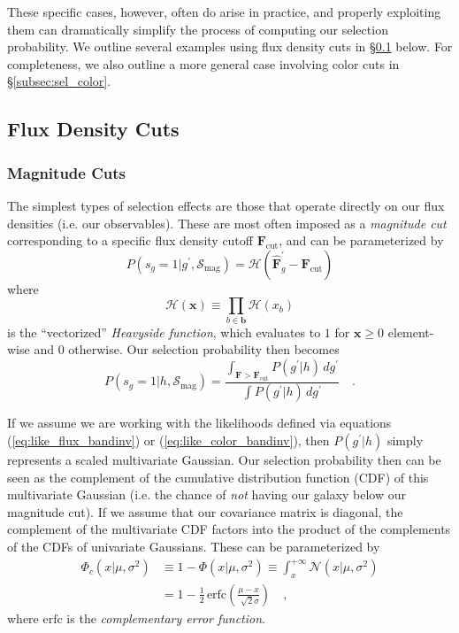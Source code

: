 \documentclass[a4paper,fleqn,usenatbib,english]{mnras}
\newcommand{\rom}[2]{\ensuremath{#1_{\mathrm{#2}}}} %
\newcommand{\erfc}{\ensuremath{\textrm{erfc}}} %
\begin{document}
These specific cases, however, often do arise in practice, and properly exploiting them can dramatically simplify the process of computing our selection probability. We outline several examples using flux density cuts in \S\ref{subsec:sel_flux} below. For completeness, we also outline a more general case involving color cuts in \S\ref{subsec:sel_color}.

\subsection{Flux Density Cuts}
\label{subsec:sel_flux}

\subsubsection{Magnitude Cuts}
\label{subsubsec:sel_mag}

The simplest types of selection effects are those that operate directly on our flux densities (i.e. our observables). These are most often imposed as a \textit{magnitude cut} corresponding to a specific flux density cutoff $\rom{\mathbf{F}}{cut}$, and can be parameterized by
\begin{equation}
P(s_g=1|g^\prime,\rom{\mathcal{S}}{mag})=\mathcal{H}(\mathbf{\hat{F}}^\prime_g-\rom{\mathbf{F}}{cut})
\end{equation}
where
\begin{equation}
\mathcal{H}(\mathbf{x}) \equiv \prod_{b\in\mathbf{b}} \mathcal{H}(x_b)
\end{equation}
is the ``vectorized'' \textit{Heavyside function}, which evaluates to $1$ for $\mathbf{x} \geq 0$ element-wise and $0$ otherwise. Our selection probability then becomes
\begin{equation}
P(s_g=1|h,\rom{\mathcal{S}}{mag}) = \frac{\int_{\mathbf{F}>\rom{\mathbf{F}}{cut}} P(g^\prime|h) \, dg^\prime}{\int P(g^\prime|h) \, dg^\prime} \quad .
\end{equation}

If we assume we are working with the likelihoods defined via equations (\ref{eq:like_flux_bandinv}) or (\ref{eq:like_color_bandinv}), then $P(g^\prime|h)$ simply represents a scaled multivariate Gaussian. Our selection probability then can be seen as the complement of the cumulative distribution function (CDF) of this multivariate Gaussian (i.e. the chance of \textit{not} having our galaxy below our magnitude cut). If we assume that our covariance matrix is diagonal, the complement of the multivariate CDF factors into the product of the complements of the CDFs of univariate Gaussians. These can be parameterized by
\begin{align}
\Phi_c(x|\mu,\sigma^2) &\equiv 1-\Phi(x|\mu,\sigma^2) \equiv \int_{x}^{+\infty} \mathcal{N}(x|\mu,\sigma^2) \nonumber \\
&= 1 - \frac{1}{2}\,\erfc\left(\frac{\mu-x}{\sqrt[]{2}\sigma}\right) \quad,
\end{align}
where $\erfc$ is the \textit{complementary error function}. 
\end{document}
